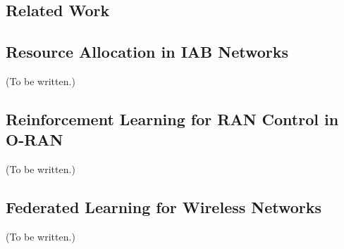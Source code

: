\begin{EnChapter}

\chapter{Related Work}
\label{chap:related-work}


\section{Resource Allocation in IAB Networks}

(To be written.)

\section{Reinforcement Learning for RAN Control in O-RAN}

(To be written.)

\section{Federated Learning for Wireless Networks}

(To be written.)

\end{EnChapter}

